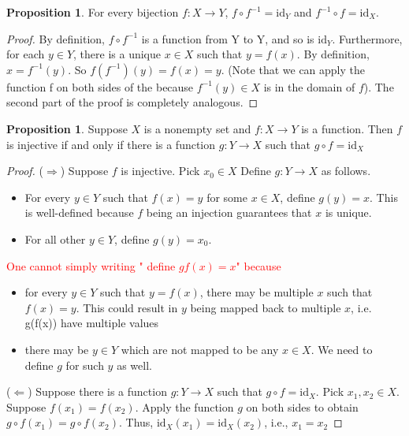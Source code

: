 \documentclass[14pt]{article}
\theoremstyle{definition}
\newtheorem{proposition}[definition]{Proposition}
\begin{document}
\vspace{2mm} %


\begin{proposition}
   For every bijection $f\colon X\rightarrow Y$, $f\circ f^{-1}=\mathrm{id}_Y$ and $f^{-1}\circ f=\mathrm{id}_X$. 
\end{proposition}

\begin{proof}
    By definition,  $f\circ f^{-1}$ is a function from Y to Y, and so is $\mathrm{id}_Y$. Furthermore, for each $y\in Y$, there is a unique $x\in X$ such that $y=f(x)$. By definition, $x=f^{-1}(y)$. So $f(f^{-1}) (y)=f(x)=y$. (Note that we can apply the function f on both sides of the because $f^{-1}(y)\in X $ is in the domain of $f$).  The second part of the proof is completely  analogous.
\end{proof}

\vspace{2mm} %


\begin{proposition}
Suppose $X$ is a nonempty set and  $f\colon X\rightarrow Y$ is a function. Then $f$ is injective if and only if there is a function $g\colon Y\rightarrow X$ such that $g\circ f=\mathrm{id}_X$
\end{proposition}

\begin{proof}
    ($\Rightarrow$) Suppose $f$ is injective. Pick $x_0\in X$ Define $g\colon Y\rightarrow X$ as follows. 
    \begin{itemize}
        \item For every $y\in Y$ such that $f(x)=y$ for some $x\in X$, define $g(y)=x$. This is well-defined because $f$ being an injection guarantees that $x$ is unique.
        \item For all other $y\in Y$, define $g(y)=x_0$. 
    \end{itemize}
    \textcolor{red}{One cannot simply writing " define $gf(x)=x$" because}
\begin{itemize}
\color{red}
    \item for every $y\in Y$ such that $y=f(x)$, there may be multiple $x$ such that $f(x)=y$. This could result in $y$ being mapped back to multiple $x$, i.e. g(f(x)) have multiple values
    \item there may be $y\in Y$ which are not mapped to be any $x\in X$. We need to define $g$ for such $y$ as well.
\end{itemize}
    ($\Leftarrow$) Suppose there is a function $g\colon Y\rightarrow X$ such that $g\circ f=\mathrm{id}_X$. Pick $x_1, x_2\in X$. Suppose $f(x_1)=f(x_2)$. Apply the function $g$ on both sides to obtain $g\circ f(x_1)=g\circ f(x_2)$. Thus, $\mathrm{id}_X(x_1)=\mathrm{id}_X(x_2)$, i.e., $x_1=x_2$
\end{proof}
\end{document}
